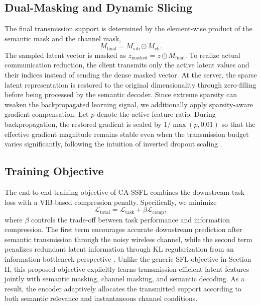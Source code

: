 \subsection{Dual-Masking and Dynamic Slicing}
The final transmission support is determined by the element-wise product of the semantic mask and the channel mask,
\begin{equation}
M_{\mathrm{final}} = M_{\mathrm{vib}} \odot M_{\mathrm{ch}}.
\end{equation}
The sampled latent vector is masked as $z_{\mathrm{masked}} = z \odot M_{\mathrm{final}}$. To realize actual communication reduction, the client transmits only the active latent values and their indices instead of sending the dense masked vector. At the server, the sparse latent representation is restored to the original dimensionality through zero-filling before being processed by the semantic decoder. Since extreme sparsity can weaken the backpropagated learning signal, we additionally apply sparsity-aware gradient compensation. Let $p$ denote the active feature ratio. During backpropagation, the restored gradient is scaled by $1/\max(p, 0.01)$ so that the effective gradient magnitude remains stable even when the transmission budget varies significantly, following the intuition of inverted dropout scaling \cite{gradientScale}.

\subsection{Training Objective}
The end-to-end training objective of CA-SSFL combines the downstream task loss with a VIB-based compression penalty. Specifically, we minimize
\begin{equation}
\mathcal{L}_{\mathrm{total}} = \mathcal{L}_{\mathrm{task}} + \beta \mathcal{L}_{\mathrm{comp}},
\end{equation}
where $\beta$ controls the trade-off between task performance and information compression. The first term encourages accurate downstream prediction after semantic transmission through the noisy wireless channel, while the second term penalizes redundant latent information through KL regularization from an information bottleneck perspective \cite{alemi2017deep,wang2023performance}. Unlike the generic SFL objective in Section II, this proposed objective explicitly learns transmission-efficient latent features jointly with semantic masking, channel masking, and semantic decoding. As a result, the encoder adaptively allocates the transmitted support according to both semantic relevance and instantaneous channel conditions.


%
